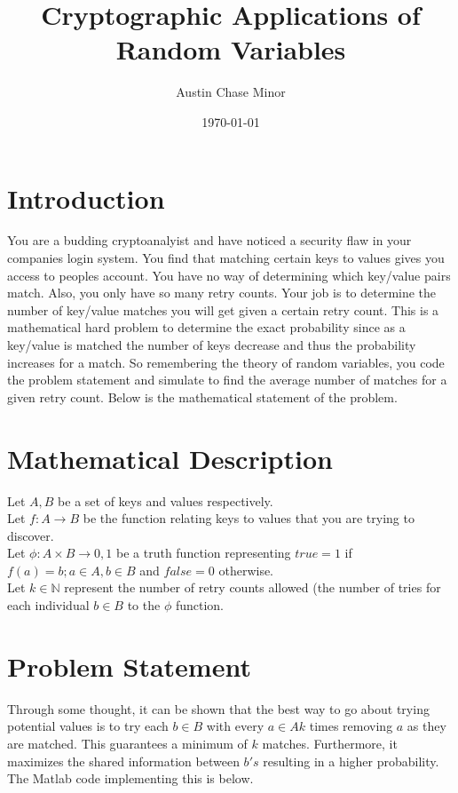 \documentclass{article}
\author{Austin Chase Minor}
\title{Cryptographic Applications of Random Variables}
\date{\today}
\begin{document}
   \maketitle

   \section{Introduction}
   You are a budding cryptoanalyist and have noticed a security
   flaw in your companies login system. You find that matching
   certain keys to values gives you access to peoples account.
   You have no way of determining which key/value pairs match.
   Also, you only have so many retry counts. 
   Your job is to determine the number of key/value matches you
   will get given a certain retry count. This is a mathematical
   hard problem to determine the exact probability since
   as a key/value is matched the number of keys decrease and thus
   the probability increases for a match. So remembering the theory
   of random variables, you code the problem statement and simulate
   to find the average number of matches for a given retry count.
   Below is the mathematical statement of the problem.

   \section{Mathematical Description}
   \begin{flushleft}
      Let $A, B$ be a set of keys and values respectively.\\
      Let $f: A \to B$ be the function relating
      keys to values that you are trying to discover.\\
      Let $\phi: A \times B \to {0,1}$ be a truth
      function representing $true = 1$ if $f(a) = b; a \in A, b \in B$
      and $false = 0$ otherwise.\\
      Let $k \in \mathbb{N}$ represent the
      number of retry counts allowed (the number of tries for each individual
      $b \in B$ to the $\phi$ function.\\
   \end{flushleft}

   \section{Problem Statement}
      Through some thought, it can be shown that the best way to go
      about trying potential values is to try each $b \in B$ with
      every $a \in A k$ times removing $a$ as they are matched. This
      guarantees a minimum of $k$ matches. Furthermore, it maximizes the
      shared information between $b's$ resulting in a higher probability.
      The Matlab code implementing this is below.
\end{document}
